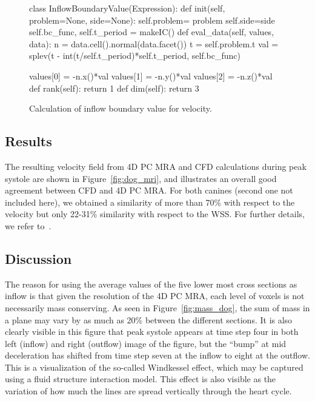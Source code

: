 \begin{figure}
  \begin{center}
    \begin{python}
class InflowBoundaryValue(Expression):
    def init(self, problem=None, side=None):
        self.problem= problem
        self.side=side
        self.bc_func, self.t_period = makeIC()
    def eval_data(self, values, data):
        n = data.cell().normal(data.facet())
        t = self.problem.t
        val =  splev(t - int(t/self.t_period)*self.t_period, self.bc_func)

        values[0] = -n.x()*val
        values[1] = -n.y()*val
        values[2] = -n.z()*val
    def rank(self):
        return 1
    def dim(self):
        return 3
    \end{python}
    \caption{Calculation of inflow boundary value for velocity.}
    \label{fig:inflow_codeII}
  \end{center}
\end{figure}

\subsection{Results}

The resulting velocity field from 4D PC MRA and CFD calculations
during peak systole are shown in Figure~\ref{fig:dog_mri}, and
illustrates an overall good agreement between CFD and 4D PC MRA. For
both canines (second one not included here), we obtained a similarity
of more than 70\% with respect to the velocity but only 22-31\%
similarity with respect to the WSS. For further details, we refer
to~\cite{JiangJohnsonValen-SendstadEtAl2010}.

\subsection{Discussion}

The reason for using the average values of the five lower most cross
sections as inflow is that given the resolution of the 4D PC MRA, each
level of voxels is not necessarily mass conserving. As seen in
Figure~\ref{fig:mass_dog}, the sum of mass in a plane may vary by as
much as 20\% between the different sections.  It is also clearly
visible in this figure that peak systole appears at time step four in
both left (inflow) and right (outflow) image of the figure, but the
``bump'' at mid deceleration has shifted from time step seven at the
inflow to eight at the outflow.  This is a visualization of the
so-called Windkessel effect, which may be captured using a fluid
structure interaction model. This effect is also visible as the
variation of how much the lines are spread vertically through the
heart cycle.


